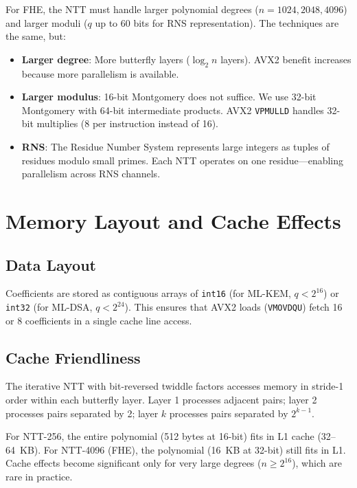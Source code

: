 \documentclass[11pt,a4paper]{article}
\begin{document}
For FHE, the NTT must handle larger polynomial degrees ($n = 1024, 2048, 4096$) and
larger moduli ($q$ up to 60 bits for RNS representation). The techniques are the same,
but:

\begin{itemize}[nosep]
  \item \textbf{Larger degree}: More butterfly layers ($\log_2 n$ layers). AVX2 benefit
    increases because more parallelism is available.
  \item \textbf{Larger modulus}: 16-bit Montgomery does not suffice. We use 32-bit
    Montgomery with 64-bit intermediate products. AVX2 \texttt{VPMULLD} handles 32-bit
    multiplies (8 per instruction instead of 16).
  \item \textbf{RNS}: The Residue Number System represents large integers as tuples of
    residues modulo small primes. Each NTT operates on one residue---enabling parallelism
    across RNS channels.
\end{itemize}

\section{Memory Layout and Cache Effects}

\subsection{Data Layout}

Coefficients are stored as contiguous arrays of \texttt{int16} (for ML-KEM, $q < 2^{16}$)
or \texttt{int32} (for ML-DSA, $q < 2^{24}$). This ensures that AVX2 loads (\texttt{VMOVDQU})
fetch 16 or 8 coefficients in a single cache line access.

\subsection{Cache Friendliness}

The iterative NTT with bit-reversed twiddle factors accesses memory in stride-1 order
within each butterfly layer. Layer 1 processes adjacent pairs; layer 2 processes pairs
separated by 2; layer $k$ processes pairs separated by $2^{k-1}$.

For NTT-256, the entire polynomial (512 bytes at 16-bit) fits in L1 cache (32--64~KB).
For NTT-4096 (FHE), the polynomial (16~KB at 32-bit) still fits in L1. Cache effects
become significant only for very large degrees ($n \geq 2^{16}$), which are rare in
practice.
\end{document}
